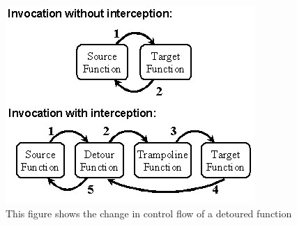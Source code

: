 \begin{figure}[!htbp]
	\centering
	\includegraphics[keepaspectratio,width=.6\textwidth]{sections/background/attacks/fig_detours.png}
	\caption{This figure shows the change in control flow of a detoured function \cite{detours}}
	\label{fig:detours}
\end{figure}

